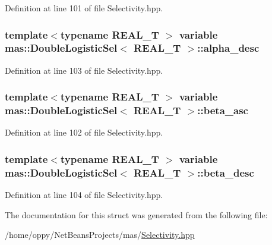 Definition at line 101 of file Selectivity.\-hpp.

\hypertarget{structmas_1_1_double_logistic_sel_af9b785ac193b2d14ab923f5a04818abe}{
\subsubsection[{alpha\-\_\-desc}]{\setlength{\rightskip}{0pt plus 5cm}template$<$typename R\-E\-A\-L\-\_\-\-T $>$ {\bf variable} {\bf mas\-::\-Double\-Logistic\-Sel}$<$ R\-E\-A\-L\-\_\-\-T $>$\-::alpha\-\_\-desc}}\label{structmas_1_1_double_logistic_sel_af9b785ac193b2d14ab923f5a04818abe}


Definition at line 103 of file Selectivity.\-hpp.

\hypertarget{structmas_1_1_double_logistic_sel_ace010a06a23e4a9145c61c5d022167c6}{
\subsubsection[{beta\-\_\-asc}]{\setlength{\rightskip}{0pt plus 5cm}template$<$typename R\-E\-A\-L\-\_\-\-T $>$ {\bf variable} {\bf mas\-::\-Double\-Logistic\-Sel}$<$ R\-E\-A\-L\-\_\-\-T $>$\-::beta\-\_\-asc}}\label{structmas_1_1_double_logistic_sel_ace010a06a23e4a9145c61c5d022167c6}


Definition at line 102 of file Selectivity.\-hpp.

\hypertarget{structmas_1_1_double_logistic_sel_a565d907c1dbd00686a08d624c4b891ea}{
\subsubsection[{beta\-\_\-desc}]{\setlength{\rightskip}{0pt plus 5cm}template$<$typename R\-E\-A\-L\-\_\-\-T $>$ {\bf variable} {\bf mas\-::\-Double\-Logistic\-Sel}$<$ R\-E\-A\-L\-\_\-\-T $>$\-::beta\-\_\-desc}}\label{structmas_1_1_double_logistic_sel_a565d907c1dbd00686a08d624c4b891ea}


Definition at line 104 of file Selectivity.\-hpp.



The documentation for this struct was generated from the following file\-:\begin{DoxyCompactItemize}
\item 
/home/oppy/\-Net\-Beans\-Projects/mas/\hyperlink{_selectivity_8hpp}{Selectivity.\-hpp}\end{DoxyCompactItemize}
